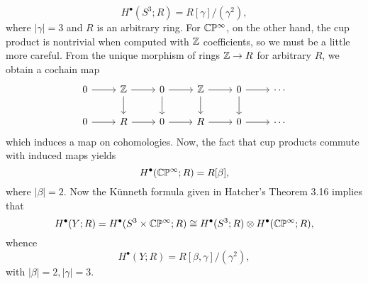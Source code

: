 \documentclass{../mathnotes}
\begin{document}
\begin{enumerate}
\begin{enumerate}[(a)]
                \[H^\bullet(S^3;R)=R[\gamma]/(\gamma^2),\]
                where $|\gamma|=3$ and $R$ is an arbitrary ring. For $\mathbb{C}\mathbb{P}^\infty$, on the
                other hand, the cup product is nontrivial when computed with $\mathbb{Z}$ coefficients,
                so we must be a little more careful. From the unique morphism of rings $\mathbb{Z}\to R$
                for arbitrary $R$, we obtain a cochain map
                \begin{equation*}
                    \begin{tikzcd}
                        0\ar{r}& \Z\ar{r}\ar{d}& 0\ar{r}\ar{d}& \Z\ar{r}\ar{d}& 0\ar{r}\ar{d}& \cdots\\
                        0\ar{r}& R\ar{r}& 0\ar{r}& R\ar{r}& 0\ar{r}& \cdots
                    \end{tikzcd}
                \end{equation*}
                which induces a map on cohomologies. Now, the fact that cup products commute with
                induced maps yields
                \[H^\bullet(\mathbb{C}\mathbb{P}^\infty;R)=R[\beta],\]
                where $|\beta|=2$. Now the K\"unneth formula given in Hatcher's Theorem 3.16
                implies that
                \[H^\bullet(Y;R)=H^\bullet(S^3\times\mathbb{C}\mathbb{P}^\infty;R)\cong H^\bullet(S^3;R)\otimes H^\bullet(\mathbb{C}\mathbb{P}^\infty;R),\]
                whence
                \[H^\bullet(Y;R)=R[\beta,\gamma]/(\gamma^2),\]
                with $|\beta|=2,|\gamma|=3$.


\end{enumerate}
\end{enumerate}
\end{document}
